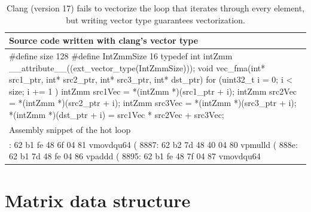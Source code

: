 \documentclass[logo,bsc,singlespacing,parskip]{infthesis}
\newenvironment{VerbatimCompact}
  {\vspace*{-2.5mm}\VerbatimEnvironment
   \par\Verbatim}
  {\endVerbatim\vspace*{-2.4mm}}
\begin{document}
\begin{table}[H]
\begin{tabular}{>{\raggedright\arraybackslash}p{14cm}}
\\
    Source code written with clang’s vector type\\
    \midrule
    \begin{VerbatimCompact}
#define size 128
#define IntZmmSize 16
typedef int intZmm __attribute__((ext_vector_type(IntZmmSize)));
void vec_fma(int* src1_ptr, int* src2_ptr,
             int* src3_ptr, int* dst_ptr) {
    for (uint32_t i = 0; i < size; i += 1 ){
        intZmm src1Vec = *(intZmm *)(src1_ptr + i);
        intZmm src2Vec = *(intZmm *)(src2_ptr + i);
        intZmm src3Vec = *(intZmm *)(src3_ptr + i);
        *(intZmm *)(dst_ptr + i) = src1Vec * src2Vec + src3Vec;
    }
}
    \end{VerbatimCompact}
    \\
    Assembly snippet of the hot loop\\
    \midrule
    \begin{VerbatimCompact}
8880: 62 b1 fe 48 6f 04 81  vmovdqu64 (%
8887: 62 b2 7d 48 40 04 80  vpmulld (%
888e: 62 b1 7d 48 fe 04 86  vpaddd (%
8895: 62 b1 fe 48 7f 04 87  vmovdqu64 %
    \end{VerbatimCompact}
    \\
\end{tabular}
\caption{Clang (version 17) fails to vectorize the loop that iterates through
every element, but writing vector type guarantees vectorization. }
\label{vec-fma-int}
\end{table}




\section{Matrix data structure}
\end{document}
